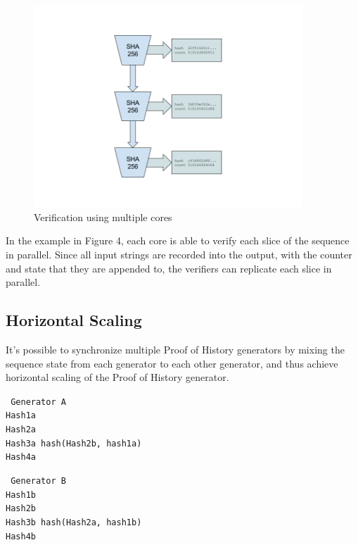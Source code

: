 \documentclass[12pt]{article}
\begin{document}
\begin{figure}
  \begin{center}
    \centering
    \includegraphics[width=0.9\textwidth]{figures/fig_4.png}
    \caption[Figure 4]{Verification using multiple cores\label{fig_4}}
  \end{center}
  \end{figure}

In the example in Figure 4, each core is able to verify each slice of the sequence in parallel.  Since all input strings are recorded into the output, with the counter and state that they are appended to, the verifiers can replicate each slice in parallel.

\subsection{Horizontal Scaling}
It’s possible to synchronize multiple Proof of History generators by mixing the sequence state from each generator to each other generator, and thus achieve horizontal scaling of the Proof of History generator.

\texttt{
Generator A\\
Hash1a\\
Hash2a\\
Hash3a hash(Hash2b, hash1a)\\
Hash4a\\
}

\texttt{
Generator B\\
Hash1b\\
Hash2b\\
Hash3b hash(Hash2a, hash1b)\\
Hash4b\\
}
\end{document}
